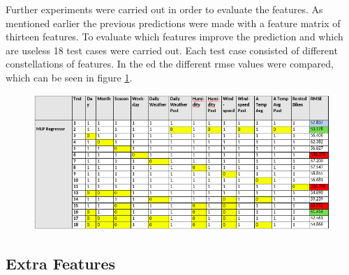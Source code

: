 Further experiments were carried out in order to evaluate the features. As mentioned earlier the previous predictions were made with a feature matrix of thirteen features. To evaluate which features improve the prediction and which are useless 18 test cases were carried out. Each test case consisted of different constellations of features. In the ed the different \acs{rmse} values were compared, which can be seen in figure \ref{fig:evalmlp}.
\begin{figure}[H]
\hspace{-1.5cm}
\includegraphics[width=1.2\textwidth]{img/evalmlp}\label{fig:evalmlp}
\label{fig:evalmlp}
\end{figure}
\subsection{Extra Features}
